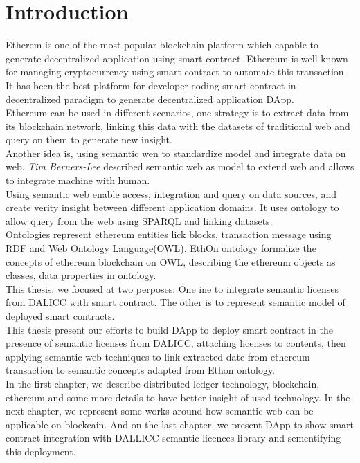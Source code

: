 \section{Introduction}

Etherem is one of the most popular blockchain platform which capable to generate decentralized application using smart contract. Ethereum is well-known for managing cryptocurrency using smart contract to automate this transaction.
It has been the best platform for developer coding smart contract in decentralized paradigm to generate decentralized application DApp.\\
Ethereum can be used in different scenarios, one strategy is to extract data from its blockchain network, linking  this data with the datasets of traditional web and query on them to generate new insight. \\
Another idea is, using semantic wen to standardize model and integrate data on web.  \textit{Tim Berners-Lee} described semantic web as model to extend web and allows to integrate machine with human. \\
Using semantic web enable access, integration and query on data sources, and create verity insight between different application domains. It uses ontology to allow query from the web using SPARQL and linking datasets. \\
Ontologies represent ethereum entities lick blocks, transaction message using RDF and Web Ontology Language(OWL). EthOn ontology formalize the concepts of ethereum blockchain on OWL, describing the ethereum objects as classes, data properties in ontology.\\
This thesis, we focused at two perposes: One ine to integrate semantic licenses from DALICC with smart contract. The other is to represent semantic model of deployed smart contracts. \\
This thesis present our efforts to build DApp to deploy smart contract in the presence of semantic licenses from DALICC, attaching licenses to contents, then applying semantic web techniques to link extracted date from ethereum transaction to semantic concepts adapted from Ethon ontology. \\
In the first chapter, we describe distributed ledger technology, blockchain, ethereum and some more details  to have better insight of used technology. In the next chapter, we represent some works around how semantic web can be applicable on blockcain. And on the last chapter, we present DApp to show smart contract integration with DALLICC semantic licences library and sementifying this deployment.





